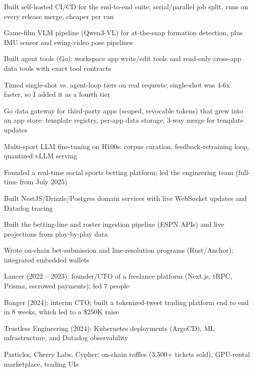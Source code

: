 \documentclass[print]{jack-resume}
\begin{document}
\begin{tightemize}
    \item Built self-hosted CI/CD for the end-to-end suite: serial/parallel job split, runs on every release merge, cheaper per run
    \item Game-film VLM pipeline (Qwen3-VL) for at-the-snap formation detection, plus IMU sensor and swing-video pose pipelines
    \item Built agent tools (Go): workspace app write/edit tools and read-only cross-app data tools with exact tool contracts
    \item Timed single-shot vs. agent-loop tiers on real requests; single-shot was 4-6x faster, so I added it as a fourth tier
    \item Go data gateway for third-party apps (scoped, revocable tokens) that grew into an app store: template registry, per-app data storage, 3-way merge for template updates
    \item Multi-sport LLM fine-tuning on H100s: corpus curation, feedback-retraining loop, quantized vLLM serving
\end{tightemize}
\sectionsep

\begin{tightemize}
    \item Founded a real-time social sports betting platform; led the engineering team (full-time from July 2025)
    \item Built NestJS/Drizzle/Postgres domain services with live WebSocket updates and Datadog tracing
    \item Built the betting-line and roster ingestion pipeline (ESPN APIs) and live projections from play-by-play data
    \item Wrote on-chain bet-submission and line-resolution programs (Rust/Anchor); integrated embedded wallets
\end{tightemize}
\sectionsep

\begin{tightemize}
    \item Lancer (2022 – 2023): founder/CTO of a freelance platform (Next.js, tRPC, Prisma, escrowed payments); led 7 people
    \item Banger (2024): interim CTO; built a tokenized-tweet trading platform end to end in 8 weeks, which led to a \$250K raise
    \item Trustless Engineering (2024): Kubernetes deployments (ArgoCD), ML infrastructure, and Datadog observability
    \item Particles, Cherry Labs, Cypher: on-chain raffles (3,500+ tickets sold), GPU-rental marketplace, trading UIs
\end{tightemize}
\sectionsep
\end{document}
